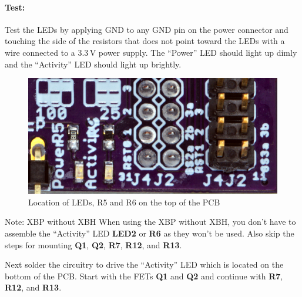 \documentclass[twoside,11pt]{cergdoc}
\begin{document}
\paragraph{Test:} Test the
LEDs by applying GND to any GND pin on the power connector and touching the side 
of the resistors that does not point toward the LEDs with a wire connected to a 
3.3\,V power supply. The
``Power'' LED should light up dimly and the ``Activity'' LED should light up brightly.

\begin{figure}[ht]
  \begin{center}
    \includegraphics[scale=0.8]{figures/xbp-leds}
    \caption{Location of LEDs, R5 and R6 on the top of the PCB}
  \end{center}
\end{figure}

\begin{cergbox}{Note: XBP without XBH}
    When using the XBP without XBH, you don't have to assemble the 
    ``Activity'' LED \textbf{LED2} or \textbf{R6} as they won't be used.
    Also skip the steps for mounting \textbf{Q1}, \textbf{Q2}, \textbf{R7},
    \textbf{R12}, and \textbf{R13}.
\end{cergbox}

\noindent Next solder the circuitry to drive the ``Activity'' LED which is located
on the bottom of the PCB. Start with the FETs \textbf{Q1} and \textbf{Q2}
and continue with \textbf{R7}, \textbf{R12}, and \textbf{R13}.
\end{document}
